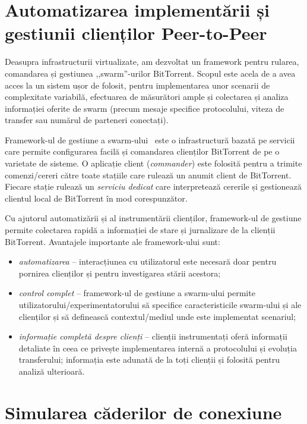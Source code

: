 \section{Automatizarea implementării și gestiunii clienților Peer-to-Peer}
\label{sec:virt-infra:auto-deploy}

Deasupra infrastructurii virtualizate, am dezvoltat un framework pentru
rularea, comandarea și gestiunea ,,swarm''-urilor BitTorrent. Scopul
este acela de a avea acces la un sistem ușor de folosit, pentru implementarea
unor scenarii de complexitate variabilă, efectuarea de măsurători ample și
colectarea și analiza informației oferite de swarm (precum mesaje specifice
protocolului, viteza de transfer sau numărul de parteneri conectați).

Framework-ul de gestiune a swarm-ului~\cite{swarm-management}
este o infrastructură bazată pe servicii care permite configurarea facilă
și comandarea clienților BitTorrent de pe o varietate de sisteme. O aplicație
client (\textit{commander}) este folosită pentru a trimite comenzi/cereri
către toate stațiile care rulează un anumit client de BitTorrent. Fiecare
stație rulează un \textit{serviciu dedicat} care interpretează cererile
și gestionează clientul local de BitTorrent în mod corespunzător.

Cu ajutorul automatizării și al instrumentării clienților, framework-ul
de gestiune permite colectarea rapidă a informației de stare și jurnalizare
de la clienții BitTorrent. Avantajele importante ale framework-ului sunt:

\begin{itemize}
  \item \textit{automatizarea} -- interacțiunea cu utilizatorul este
  necesară doar pentru pornirea clienților și pentru investigarea stării
  acestora;
  \item \textit{control complet} -- framework-ul de gestiune a swarm-ului
  permite utilizatorului/experimentatorului să specifice caracteristicile
  swarm-ului și ale clienților și să definească contextul/mediul unde
  este implementat scenariul;
  \item \textit{informație completă despre clienți} -- clienții instrumentați
  oferă informații detaliate în ceea ce privește implementarea internă a
  protocolului și evoluția transferului; informația este adunată de la
  toți clienții și folosită pentru analiză ulterioară.
\end{itemize}

\section{Simularea căderilor de conexiune}
\label{sec:virt-infra:dropouts}

